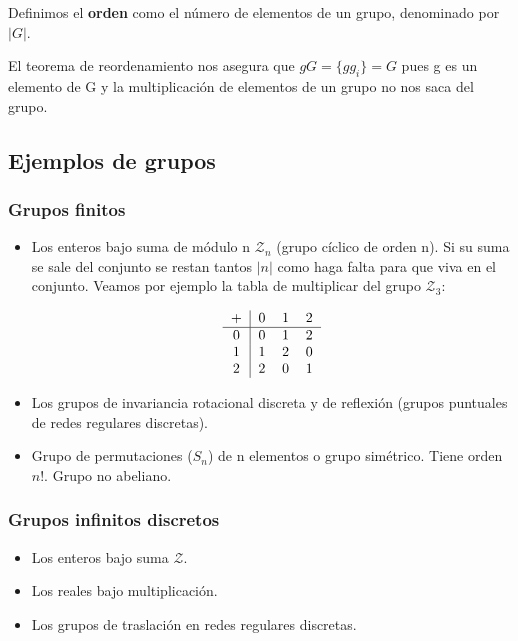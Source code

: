 \documentclass{article}
\begin{document}
\smallskip
Definimos el \textbf{orden} como el número de elementos de un grupo, denominado por $|G|$.

\smallskip
El teorema de reordenamiento nos asegura que $gG=\lbrace gg_i\rbrace =G$ pues g es un elemento de G y la multiplicación de elementos de un grupo no nos saca del grupo.

\subsection{Ejemplos de grupos}

\subsubsection{Grupos finitos}

\begin{itemize}
    \item Los enteros bajo suma de módulo n $\mathcal{Z}_n$ (grupo cíclico de orden n). Si su suma se sale del conjunto se restan tantos $|n|$ como haga falta para que viva en el conjunto. Veamos por ejemplo la tabla de multiplicar del grupo $\mathcal{Z}_3$:
    
    $$\begin{tabular}[b]{ c | c c c }

+ & 0 & 1 & 2 \\
\hline
0  & 0 & 1 & 2 \\

1 & 1 & 2 & 0 \\

2 & 2 & 0 & 1

\end{tabular} 
$$
    
    \item Los grupos de invariancia rotacional discreta y de reflexión (grupos puntuales de redes regulares discretas).
    \item Grupo de permutaciones ($S_n$) de n elementos o grupo simétrico. Tiene orden $n!$. Grupo no abeliano.
\end{itemize}

\subsubsection{Grupos infinitos discretos}

\begin{itemize}
    \item Los enteros bajo suma $\mathcal{Z}$.
    \item Los reales bajo multiplicación.
    \item Los grupos de traslación en redes regulares discretas.
\end{itemize}
\end{document}
